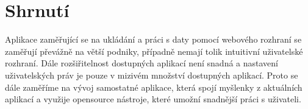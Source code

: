 \section{Shrnutí}
\par Aplikace zaměřující se na ukládání a práci s daty pomocí webového rozhraní se zaměřují převážně na větší podniky, případně nemají tolik intuitivní uživatelské rozhraní. Dále rozšiřitelnost dostupných aplikací není snadná a nastavení uživatelských práv je pouze v mizivém množství dostupných aplikací. Proto se dále zaměříme na vývoj samostatné aplikace, která spojí myšlenky z aktuálních aplikací a využije opensource nástroje, které umožní snadnější práci s uživateli.
